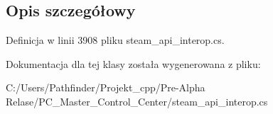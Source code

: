 \subsection{Opis szczegółowy}


Definicja w linii 3908 pliku steam\+\_\+api\+\_\+interop.\+cs.



Dokumentacja dla tej klasy została wygenerowana z pliku\+:\begin{DoxyCompactItemize}
\item 
C\+:/\+Users/\+Pathfinder/\+Projekt\+\_\+cpp/\+Pre-\/\+Alpha Relase/\+P\+C\+\_\+\+Master\+\_\+\+Control\+\_\+\+Center/steam\+\_\+api\+\_\+interop.\+cs\end{DoxyCompactItemize}
